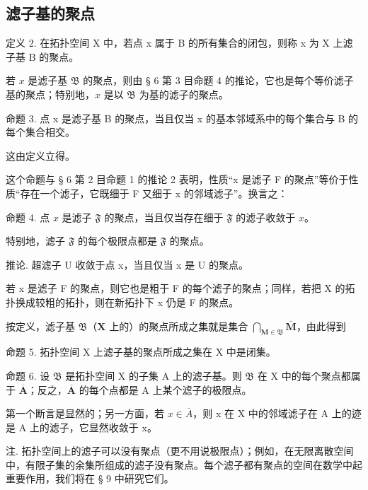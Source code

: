 \subsection{滤子基的聚点}

定义 2. 在拓扑空间 X 中，若点 x 属于 B 的所有集合的闭包，则称 x 为 X 上滤子基 B 的聚点。

若 \(x\) 是滤子基 \(\mathfrak{B}\) 的聚点，则由 § 6 第 3 目命题 4 的推论，它也是每个等价滤子基的聚点；特别地，\(x\) 是以 \(\mathfrak{B}\) 为基的滤子的聚点。

命题 3. 点 x 是滤子基 B 的聚点，当且仅当 x 的基本邻域系中的每个集合与 B 的每个集合相交。

这由定义立得。

这个命题与 § 6 第 2 目命题 1 的推论 2 表明，性质“x 是滤子 F 的聚点”等价于性质“存在一个滤子，它既细于 F 又细于 x 的邻域滤子”。换言之：

命题 4. 点 \(x\) 是滤子 \(\mathfrak{F}\) 的聚点，当且仅当存在细于 \(\mathfrak{F}\) 的滤子收敛于 \(x\)。

特别地，滤子 \(\mathfrak{F}\) 的每个极限点都是 \(\mathfrak{F}\) 的聚点。

推论. 超滤子 U 收敛于点 x，当且仅当 x 是 U 的聚点。

若 x 是滤子 F 的聚点，则它也是粗于 F 的每个滤子的聚点；同样，若把 X 的拓扑换成较粗的拓扑，则在新拓扑下 x 仍是 F 的聚点。

按定义，滤子基 \(\mathfrak{B}\)（\(\mathbf{X}\) 上的）的聚点所成之集就是集合 \(\bigcap_{\mathbf{M} \in \mathfrak{B}} \overline{\mathbf{M}}\)，由此得到

命题 5. 拓扑空间 X 上滤子基的聚点所成之集在 X 中是闭集。

命题 6. 设 \(\mathfrak{B}\) 是拓扑空间 X 的子集 A 上的滤子基。则 \(\mathfrak{B}\) 在 X 中的每个聚点都属于 \(\overline{\mathbf{A}}\)；反之，\(\overline{\mathbf{A}}\) 的每个点都是 A 上某个滤子的极限点。

第一个断言是显然的；另一方面，若 \(x \in \overline{A}\)，则 x 在 X 中的邻域滤子在 A 上的迹是 A 上的滤子，它显然收敛于 x。

注. 拓扑空间上的滤子可以没有聚点（更不用说极限点）；例如，在无限离散空间中，有限子集的余集所组成的滤子没有聚点。每个滤子都有聚点的空间在数学中起重要作用，我们将在 § 9 中研究它们。

